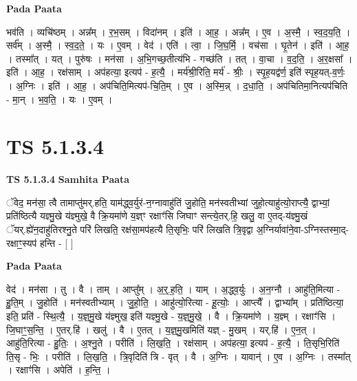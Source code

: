 \documentclass[17pt]{extarticle}
\begin{document}
\textbf{Pada Paata} \newline

भव॑ति । व्यचि॑ष्ठम् । अन्न᳚म् । र॒भ॒सम् । विदा॑नम् । इति॑ । आ॒ह॒ । अन्न᳚म् । ए॒व । अ॒स्मै॒ । स्व॒द॒य॒ति॒ । सर्व᳚म् । अ॒स्मै॒ । स्व॒द॒ते॒ । यः । ए॒वम् । वेद॑ । एति॑ । त्वा॒ । जि॒घ॒र्मि॒ । वच॑सा । घृ॒तेन॑ । इति॑ । आ॒ह॒ । तस्मा᳚त् । यत् । पुरु॑षः । मन॑सा । अ॒भि॒गच्छ॒तीत्य॑भि - गच्छ॑ति । तत् । वा॒चा । व॒द॒ति॒ । अ॒र॒क्षसा᳚ । इति॑ । आ॒ह॒ । रक्ष॑साम् । अप॑हत्या॒ इत्यप॑ - ह॒त्यै॒ । मर्य॑श्री॒रिति॒ मर्य॑ - श्रीः॒ । स्पृ॒ह॒यद्व॑र्ण॒ इति॑ स्पृह॒यत्-व॒र्णः॒ । अ॒ग्निः । इति॑ । आ॒ह॒ । अप॑चिति॒मित्यप॑-चि॒ति॒म् । ए॒व । अ॒स्मि॒न्न् । द॒धा॒ति॒ । अप॑चितिमा॒नित्यप॑चिति - मा॒न् । भ॒व॒ति॒ । यः । ए॒वम् ।  \newline





\section{ TS 5.1.3.4 }

\textbf{TS 5.1.3.4 } \newline
\textbf{Samhita Paata} \newline

ॅवेद॒ मन॑सा॒ त्वै तामाप्तु॑मर्.हति॒ याम॑द्ध्व॒र्युर॑-न॒ग्नावाहु॑तिं जु॒होति॒ मन॑स्वतीभ्यां जुहो॒त्याहु॑त्यो॒राप्त्यै॒ द्वाभ्यां॒ प्रति॑ष्ठित्यै यज्ञ्मु॒खे य॑ज्ञ्मुखे॒ वै क्रि॒यमा॑णे य॒ज्ञ्ꣳ रक्षाꣳ॑सि जिघाꣳ सन्त्ये॒तर्.हि॒ खलु॒ वा ए॒तद्-य॑ज्ञ्मु॒खं ॅयर्.ह्ये॑न॒दाहु॑तिरश्नु॒ते परि॑ लिखति॒ रक्ष॑सा॒मप॑हत्यै ति॒सृभिः॒ परि॑ लिखति त्रि॒वृद्वा अ॒ग्निर्यावा॑ने॒वा-ऽग्निस्तस्मा॒द्-रक्षाꣳ॒॒स्यप॑ हन्ति - [  ] \newline

\textbf{Pada Paata} \newline

वेद॑ । मन॑सा । तु । वै । ताम् । आप्तु᳚म् । अ॒र्॒.ह॒ति॒ । याम् । अ॒द्ध्व॒र्युः । अ॒न॒ग्नौ । आहु॑ति॒मित्या - हु॒ति॒म् । जु॒होति॑ । मन॑स्वतीभ्याम् । जु॒हो॒ति॒ । आहु॑त्यो॒रित्या - हू॒त्योः॒ । आप्त्यै᳚ । द्वाभ्या᳚म् । प्रति॑ष्ठित्या॒ इति॒ प्रति॑ - स्थि॒त्यै॒ । य॒ज्ञ्॒मु॒खे य॑ज्ञ्मुख॒ इति॑ यज्ञ्मु॒खे - य॒ज्ञ्॒मु॒खे॒ । वै । क्रि॒यमा॑णे । य॒ज्ञ्म् । रक्षाꣳ॑सि । जि॒घाꣳ॒॒स॒न्ति॒ । ए॒तर्.हि॑ । खलु॑ । वै । ए॒तत् । य॒ज्ञ्॒मु॒खमिति॑ यज्ञ् - मु॒खम् । यर्.हि॑ । ए॒न॒त् । आहु॑ति॒रित्या - हु॒तिः॒ । अ॒श्नु॒ते । परीति॑ । लि॒ख॒ति॒ । रक्ष॑साम् । अप॑हत्या॒ इत्यप॑ - ह॒त्यै॒ । ति॒सृभि॒रिति॑ ति॒सृ - भिः॒ । परीति॑ । लि॒ख॒ति॒ । त्रि॒वृदिति॑ त्रि - वृत् । वै । अ॒ग्निः । यावान्॑ । ए॒व । अ॒ग्निः । तस्मा᳚त् । रक्षाꣳ॑सि । अपेति॑ । ह॒न्ति॒ ।  \newline
\end{document}
